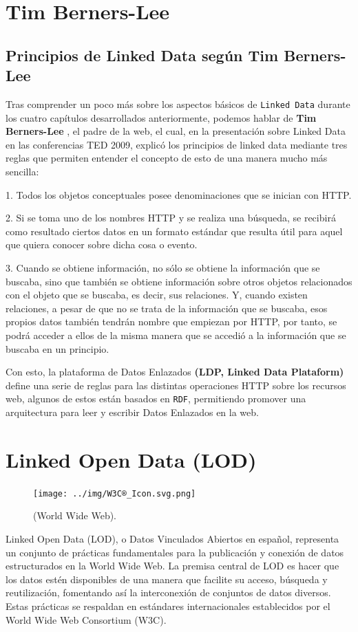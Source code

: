\documentclass[11pt]{report}
\begin{document}
\chapter{Tim Berners-Lee}

\section{Principios de Linked Data según Tim Berners-Lee}

Tras comprender un poco más sobre los aspectos básicos de \texttt{Linked Data} durante los cuatro capítulos desarrollados anteriormente, podemos hablar de \textbf{Tim Berners-Lee } \cite{11}, el padre de la web,  el cual, en la presentación sobre Linked Data en las conferencias TED 2009, explicó los principios de linked data mediante tres reglas que permiten entender el concepto de esto de una manera mucho más sencilla:

1. Todos los objetos conceptuales posee denominaciones que se inician con HTTP.

2. Si se toma uno de los nombres HTTP y se realiza una búsqueda, se recibirá como resultado ciertos datos en un formato estándar que resulta útil para aquel que quiera conocer sobre dicha cosa o evento.

3. Cuando se obtiene información, no sólo se obtiene la información que se buscaba, sino que también se obtiene información sobre otros objetos relacionados con el objeto que se buscaba, es decir, sus relaciones. Y, cuando existen relaciones, a pesar de que no se trata de la información que se buscaba, esos propios datos también tendrán nombre que empiezan por HTTP, por tanto, se podrá acceder a ellos de la misma manera que se accedió a la información que se buscaba en un principio.

Con esto, la plataforma de Datos Enlazados \textbf{(LDP, Linked Data Plataform)} \cite{18} define una serie de reglas para las distintas operaciones HTTP sobre los recursos web, algunos de estos están basados en \texttt{RDF}, permitiendo promover una arquitectura para leer y escribir Datos Enlazados en la web.

\chapter{Linked Open Data (LOD)}
		\begin{figure}
			\centering
			\texttt{[image: ../img/W3C®\_Icon.svg.png]}
			\caption{(World Wide Web).}
			\label{fig:od->W3C}
		\end{figure}
		Linked Open Data (LOD), o Datos Vinculados Abiertos en español, representa un conjunto de prácticas fundamentales para la publicación y conexión de datos estructurados en la World Wide Web. La premisa central de LOD es hacer que los datos estén disponibles de una manera que facilite su acceso, búsqueda y reutilización, fomentando así la interconexión de conjuntos de datos diversos. Estas prácticas se respaldan en estándares internacionales establecidos por el World Wide Web Consortium (W3C).
		
\end{document}
